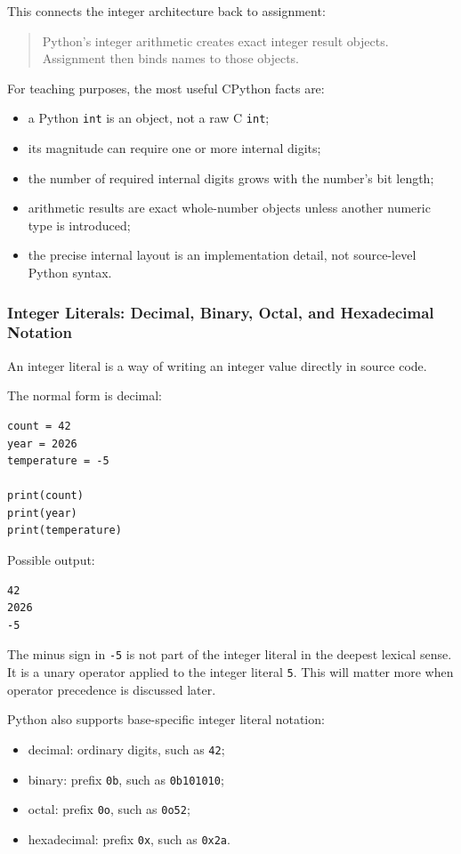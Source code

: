 This connects the integer architecture back to assignment:

\begin{quote}
Python's integer arithmetic creates exact integer result objects. Assignment then binds names to those objects.
\end{quote}

For teaching purposes, the most useful CPython facts are:

\begin{itemize}
    \item a Python \texttt{int} is an object, not a raw C \texttt{int};
    \item its magnitude can require one or more internal digits;
    \item the number of required internal digits grows with the number's bit length;
    \item arithmetic results are exact whole-number objects unless another numeric type is introduced;
    \item the precise internal layout is an implementation detail, not source-level Python syntax.
\end{itemize}

\subsubsection{Integer Literals: Decimal, Binary, Octal, and Hexadecimal Notation}

An integer literal is a way of writing an integer value directly in source code.

The normal form is decimal:

\begin{verbatim}
count = 42
year = 2026
temperature = -5

print(count)
print(year)
print(temperature)
\end{verbatim}

Possible output:

\begin{verbatim}
42
2026
-5
\end{verbatim}

The minus sign in \texttt{-5} is not part of the integer literal in the deepest lexical sense. It is a unary operator applied to the integer literal \texttt{5}. This will matter more when operator precedence is discussed later.

Python also supports base-specific integer literal notation:

\begin{itemize}
    \item decimal: ordinary digits, such as \texttt{42};
    \item binary: prefix \texttt{0b}, such as \texttt{0b101010};
    \item octal: prefix \texttt{0o}, such as \texttt{0o52};
    \item hexadecimal: prefix \texttt{0x}, such as \texttt{0x2a}.
\end{itemize}


